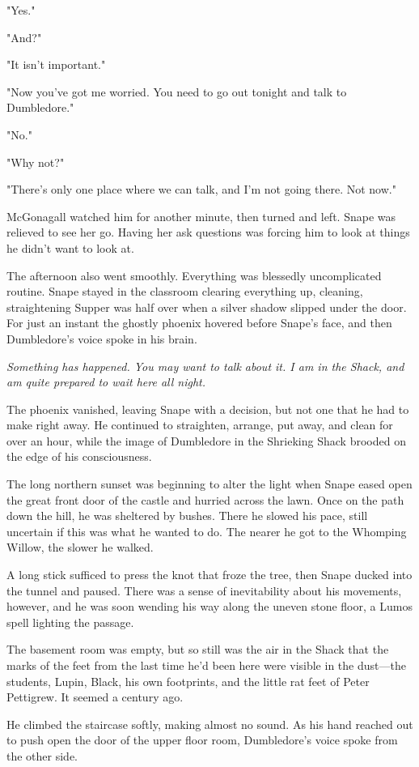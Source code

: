 "Yes."

"And?"

"It isn't important."

"Now you've got me worried. You need to go out tonight and talk to Dumbledore."

"No."

"Why not?"

"There's only one place where we can talk, and I'm not going there. Not now."

McGonagall watched him for another minute, then turned and left. Snape was relieved to see her go. Having her ask questions was forcing him to look at things he didn't want to look at.

The afternoon also went smoothly. Everything was blessedly uncomplicated routine. Snape stayed in the classroom clearing everything up, cleaning, straightening{\el} Supper was half over when a silver shadow slipped under the door. For just an instant the ghostly phoenix hovered before Snape's face, and then Dumbledore's voice spoke in his brain.

\emph{Something has happened. You may want to talk about it. I am in the Shack, and am quite prepared to wait here all night.}

The phoenix vanished, leaving Snape with a decision, but not one that he had to make right away. He continued to straighten, arrange, put away, and clean for over an hour, while the image of Dumbledore in the Shrieking Shack brooded on the edge of his consciousness.

The long northern sunset was beginning to alter the light when Snape eased open the great front door of the castle and hurried across the lawn. Once on the path down the hill, he was sheltered by bushes. There he slowed his pace, still uncertain if this was what he wanted to do. The nearer he got to the Whomping Willow, the slower he walked.

A long stick sufficed to press the knot that froze the tree, then Snape ducked into the tunnel and paused. There was a sense of inevitability about his movements, however, and he was soon wending his way along the uneven stone floor, a Lumos spell lighting the passage.

The basement room was empty, but so still was the air in the Shack that the marks of the feet from the last time he'd been here were visible in the dust—the students, Lupin, Black, his own footprints, and the little rat feet of Peter Pettigrew. It seemed a century ago.

He climbed the staircase softly, making almost no sound. As his hand reached out to push open the door of the upper floor room, Dumbledore's voice spoke from the other side.


